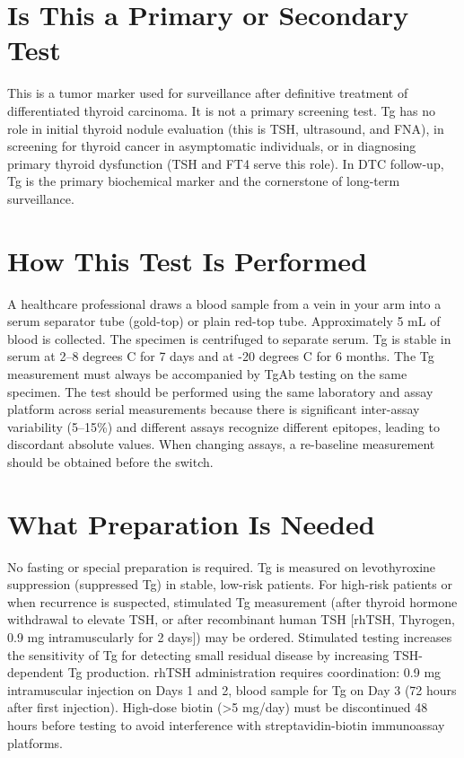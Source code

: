 \section*{Is This a Primary or Secondary Test}
This is a tumor marker used for surveillance after definitive treatment of differentiated thyroid carcinoma. It is not a primary screening test. Tg has no role in initial thyroid nodule evaluation (this is TSH, ultrasound, and FNA), in screening for thyroid cancer in asymptomatic individuals, or in diagnosing primary thyroid dysfunction (TSH and FT4 serve this role). In DTC follow-up, Tg is the primary biochemical marker and the cornerstone of long-term surveillance.

\section*{How This Test Is Performed}
A healthcare professional draws a blood sample from a vein in your arm into a serum separator tube (gold-top) or plain red-top tube. Approximately 5 mL of blood is collected. The specimen is centrifuged to separate serum. Tg is stable in serum at 2--8 degrees C for 7 days and at -20 degrees C for 6 months. The Tg measurement must always be accompanied by TgAb testing on the same specimen. The test should be performed using the same laboratory and assay platform across serial measurements because there is significant inter-assay variability (5--15\%) and different assays recognize different epitopes, leading to discordant absolute values. When changing assays, a re-baseline measurement should be obtained before the switch.

\section*{What Preparation Is Needed}
No fasting or special preparation is required. Tg is measured on levothyroxine suppression (suppressed Tg) in stable, low-risk patients. For high-risk patients or when recurrence is suspected, stimulated Tg measurement (after thyroid hormone withdrawal to elevate TSH, or after recombinant human TSH [rhTSH, Thyrogen, 0.9 mg intramuscularly for 2 days]) may be ordered. Stimulated testing increases the sensitivity of Tg for detecting small residual disease by increasing TSH-dependent Tg production. rhTSH administration requires coordination: 0.9 mg intramuscular injection on Days 1 and 2, blood sample for Tg on Day 3 (72 hours after first injection). High-dose biotin (>5 mg/day) must be discontinued 48 hours before testing to avoid interference with streptavidin-biotin immunoassay platforms.

